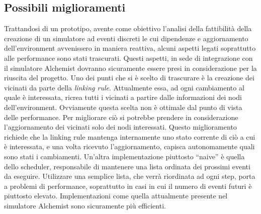\documentclass[12pt,a4paper,openright,twoside]{book}
\begin{document}
\subsection{Possibili miglioramenti}
Trattandosi di un prototipo, avente come obiettivo l'analisi della fattibilità della creazione di un simulatore ad eventi discreti le cui dipendenze e aggiornamento dell'environment avvenissero in maniera reattiva, alcuni aspetti legati soprattutto alle performance sono stati trascurati. Questi aspetti, in sede di integrazione con il simulatore Alchemist dovranno sicuramente essere presi in considerazione per la riuscita del progetto. 
Uno dei punti che si è scelto di trascurare è la creazione dei vicinati da parte della \textit{linking rule}. Attualmente essa, ad ogni cambiamento al quale è interessata, ricrea tutti i vicinati a partire dalle informazioni dei nodi dell'environment. Ovviamente questa scelta non è ottimale dal punto di vista delle performance. Per migliorare ciò si potrebbe prendere in considerazione l'aggiornamento dei vicinati solo dei nodi interessati. Questo miglioramento richiede che la linking rule mantenga internamente uno stato corrente di ciò a cui è interessata, e una volta ricevuto l'aggiornamento, capisca autonomamente quali sono stati i cambiamenti. 
Un'altra implementazione piuttosto ``naive'' è quella dello scheduler, responsabile di mantenere una lista ordinata dei prossimi eventi da eseguire. 
Utilizzare una semplice lista, che verrà riordinata ad ogni step, porta a problemi di performance, soprattutto in casi in cui il numero di eventi futuri è piuttosto elevato. 
Implementazioni come quella attualmente presente nel simulatore Alchemist sono sicuramente più efficienti. 


\end{document}
